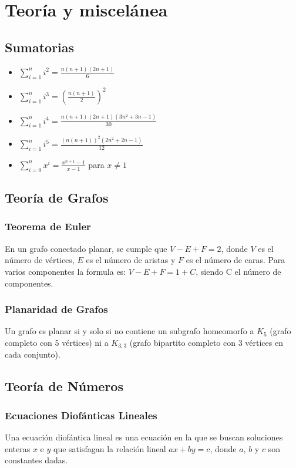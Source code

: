 \section{Teoría y miscelánea}

\subsection{Sumatorias}
\begin{multicols}{2}
\begin{itemize}
    \item $\sum_{i=1}^{n} i^2 = \frac{n(n+1)(2n+1)}{6}$
    \item $\sum_{i=1}^{n} i^3 = \left(\frac{n(n+1)}{2}\right)^2$
    \item $\sum_{i=1}^{n} i^4 = \frac{n(n+1)(2n+1)(3n^2+3n-1)}{30}$
    \item $\sum_{i=1}^{n} i^5 = \frac{(n(n+1))^2(2n^2+2n-1)}{12}$
    \item $\sum_{i=0}^{n} x^i = \frac{x^{n+1}-1}{x-1}$ para $x \neq 1$
\end{itemize}
\end{multicols}

\subsection{Teoría de Grafos}
\subsubsection{Teorema de Euler}
En un grafo conectado planar, se cumple que $V - E + F = 2$, donde $V$ es el número de vértices, $E$ es el número de aristas y $F$ es el número de caras.
Para varios componentes la formula es: $V - E + F = 1 + C$, siendo C el número de componentes.

\subsubsection{Planaridad de Grafos}
Un grafo es planar si y solo si no contiene un subgrafo homeomorfo a $K_5$ (grafo completo con 5 vértices) ni a $K_{3,3}$ (grafo bipartito completo con 3 vértices en cada conjunto).

\subsection{Teoría de Números}
\subsubsection{Ecuaciones Diofánticas Lineales}
Una ecuación diofántica lineal es una ecuación en la que se buscan soluciones enteras $x$ e $y$ que satisfagan la relación lineal $ax + by = c$, donde $a$, $b$ y $c$ son constantes dadas.

